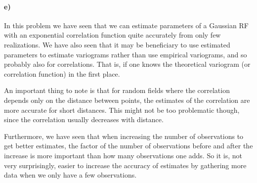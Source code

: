 \paragraph{e)}
In this problem we have seen that we can estimate parameters of a Gaussian RF with an exponential correlation function quite accurately from only few realizations. We have also seen that it may be beneficiary to use estimated parameters to estimate variograms rather than use empirical variograms, and so probably also for correlations. That is, if one knows the theoretical variogram (or correlation function) in the first place.

An important thing to note is that for random fields where the correlation depends only on the distance between points, the estimates of the correlation are more accurate for short distances. This might not be too problematic though, since the correlation usually decreases with distance.

Furthermore, we have seen that when increasing the number of observations to get better estimates, the factor of the number of observations before and after the increase is more important than how many observations one adds. So it is, not very surprisingly, easier to increase the accuracy of estimates by gathering more data when we only have a few observations.
